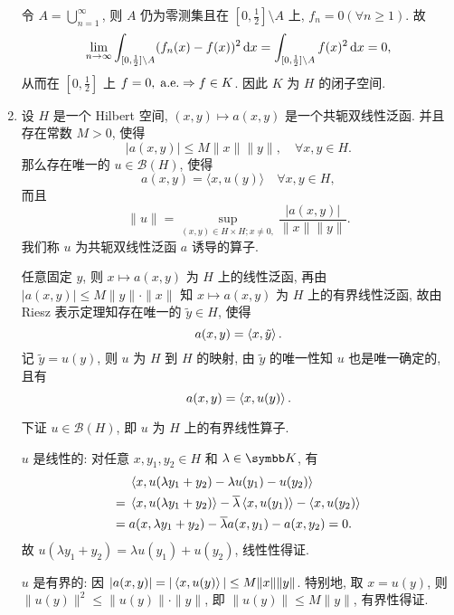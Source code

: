 \begin{enumerate}
\begin{answer}
      令 $A=\bigcup_{n=1}^{\infty}$, 则 $A$ 仍为零测集且在 $[0,\frac{1}{2}]\setminus A$
      上, $f_n=0(\forall n\geq 1)$. 故
      \[\lim_{n\to\infty}\int_{[0,\frac{1}{2}]\setminus A}(f_n(x)-f(x))^2\mathop{}\!\mathrm{d} x=\int_{[0,\frac{1}{2}]\setminus A}f(x)^2\mathop{}\!\mathrm{d} x=0,\]
      从而在 $[0,\frac{1}{2}]$ 上 $f=0,\;\mathrm{a.e.}\Rightarrow f\in K$.
      因此 $K$ 为 $H$ 的闭子空间.
    \end{answer}
  \item 设 $H$ 是一个 Hilbert 空间, $(x, y) \mapsto a(x, y)$ 是一个共轭双线性泛函. 并且存在常数 $M>0$, 使得
  \[
    |a(x, y)| \leq M\|x\|\|y\|, \quad \forall x, y \in H .
  \]
  那么存在唯一的 $u \in \mathcal{B}(H)$, 使得
  \[
    a(x, y)=\langle x, u(y)\rangle \quad \forall x, y \in H,
  \]
  而且
  \[
    \|u\|=\sup _{(x, y) \in H \times H ; x \neq  0,} \frac{|a(x, y)|}{\|x\|\|y\|} .
  \]
  我们称 $u$ 为共轭双线性泛函 $a$ 诱导的算子.
    \begin{answer}
      任意固定 $y$, 则 $x\mapsto a(x,y)$ 为 $H$ 上的线性泛函, 再由 $|a(x,y)|\leq M\|y\|\cdot\|x\|$
      知 $x\mapsto a(x,y)$ 为 $H$ 上的有界线性泛函, 故由 Riesz 表示定理知存在唯一的 $\tilde{y}\in H$, 使得
      \[a(x,y)=\left\langle x,\tilde{y}\right\rangle.\]
      记 $\tilde{y}=u(y)$, 则 $u$ 为 $H$ 到 $H$ 的映射, 由 $\tilde{y}$ 的唯一性知 $u$ 也是唯一确定的, 且有
      \[a(x,y)=\left\langle x,u(y)\right\rangle.\]

      下证 $u\in\mathcal{B}(H)$, 即 $u$ 为 $H$ 上的有界线性算子.

      $u$ 是线性的: 对任意 $x,y_1,y_2\in H$ 和 $\lambda\in\K$, 有
      \begin{align*}
          & \left\langle x,u(\lambda y_1+y_2)-\lambda u(y_1)-u(y_2)\right\rangle \\
          ={}& \left\langle x,u(\lambda y_1+y_2)\right\rangle-\overline{\lambda}\left\langle x,u(y_1)\right\rangle-\left\langle x,u(y_2)\right\rangle \\
          ={}& a(x,\lambda y_1+y_2)-\overline{\lambda}a(x,y_1)-a(x,y_2)=0.
      \end{align*}
      故 $u(\lambda y_1+y_2)=\lambda u(y_1)+u(y_2)$, 线性性得证.

      $u$ 是有界的: 因 $|a(x,y)|=|\left\langle x,u(y)\right\rangle|\leq M\|x\|\|y\|$.
      特别地, 取 $x=u(y)$, 则 $\|u(y)\|^2\leq \|u(y)\|\cdot\|y\|$,
      即 $\|u(y)\|\leq M\|y\|$, 有界性得证.


\end{answer}
\end{enumerate}
